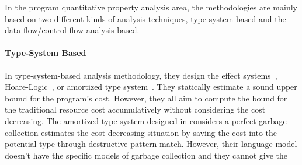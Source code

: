{
 In the program quantitative property analysis area, the methodologies are mainly based on
 two different kinds of analysis techniques, type-system-based and the data-flow/control-flow analysis based.
\paragraph*{Type-System Based}
In type-system-based analysis methodology,
they design the effect systems~\cite{cciccek2017relational,radivcek2017monadic,qu2019relational},
Hoare-Logic~\cite{gaboardi2021graded}, or amortized type system~\cite{hoffmann_jost_2022}.
They statically estimate a sound upper bound for the program's cost.
However, they all aim to compute the bound for the traditional resource cost accumulatively
without considering the cost decreasing. 
The amortized type-system designed in \cite{hoffmann_jost_2022} considers a perfect garbage collection
estimates the cost decreasing situation by saving the cost into the potential type through destructive pattern match.
However, their language model doesn't have the specific models of garbage collection and they cannot give the 
}
